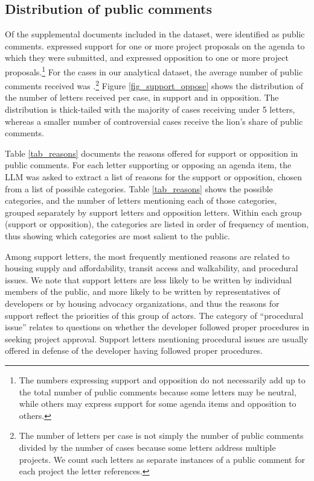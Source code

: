 \subsection{Distribution of public comments}

Of the  supplemental documents included in the dataset,  were identified as public comments.  expressed support for one or more project proposals on the agenda to which they were submitted, and  expressed opposition to one or more project proposals.\footnote{The numbers expressing support and opposition do not necessarily add up to the total number of public comments because some letters may be neutral, while others may express support for some agenda items and opposition to others.}  For the  cases in our analytical dataset, the average number of public comments received was .\footnote{The number of letters per case is not simply the number of public comments divided by the number of cases because some letters address multiple projects. We count such letters as separate instances of a public comment for each project the letter references.} Figure \ref{fig_support_oppose} shows the distribution of the number of letters received per case, in support and in opposition. The distribution is thick-tailed with the majority of cases receiving under 5 letters, whereas a smaller number of controversial cases receive the lion's share of public comments.

Table \ref{tab_reasons} documents the reasons offered for support or opposition in public comments. For each letter supporting or opposing an agenda item, the LLM was asked to extract a list of reasons for the support or opposition, chosen from a list of possible categories. Table \ref{tab_reasons} shows the possible categories, and the number of letters mentioning each of those categories, grouped separately by support letters and opposition letters. Within each group (support or opposition), the categories are listed in order of frequency of mention, thus showing which categories are most salient to the public. 

Among support letters, the most frequently mentioned reasons are related to housing supply and affordability, transit access and walkability, and procedural issues. We note that support letters are less likely to be written by individual members of the public, and more likely to be written by representatives of developers or by housing advocacy organizations, and thus the reasons for support reflect the priorities of this group of actors. The category of ``procedural issue'' relates to questions on whether the developer followed proper procedures in seeking project approval. Support letters mentioning procedural issues are usually offered in defense of the developer having followed proper procedures.

